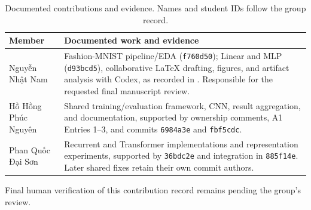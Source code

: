 \begin{table}[H]
    \centering
    \caption{Documented contributions and evidence. Names and student IDs follow the group record.}
    \small
    \begin{tabularx}{\textwidth}{@{}p{}Y@{}}
        \toprule
        Member & Documented work and evidence \\
        \midrule
        Nguyễn Nhật Nam & Fashion-MNIST pipeline/EDA (\texttt{f760d50}); Linear and MLP (\texttt{d93bcd5}), collaborative LaTeX drafting, figures, and artifact analysis with Codex, as recorded in . Responsible for the requested final manuscript review. \\
        Hồ Hồng Phúc Nguyên & Shared training/evaluation framework, CNN, result aggregation, and documentation, supported by ownership comments,  A1 Entries 1--3, and commits \texttt{6984a3e} and \texttt{fbf5cdc}. \\
        Phan Quốc Đại Sơn & Recurrent and Transformer implementations and representation experiments, supported by \texttt{36bdc2e} and integration in \texttt{885f14e}. Later shared fixes retain their own commit authors. \\
        \bottomrule
    \end{tabularx}
\end{table}

Final human verification of this contribution record remains pending the group's review.
